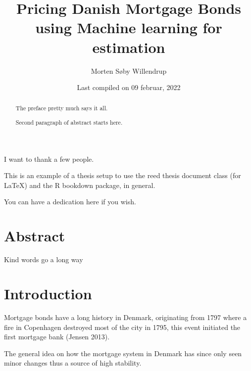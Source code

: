 \documentclass[12pt,twoside]{reedthesis}
\title{Pricing Danish Mortgage Bonds using Machine learning for estimation}
\author{Morten Søby Willendrup}
\date{Last compiled on 09 februar, 2022}
\begin{document}
  \maketitle

\frontmatter %
\pagestyle{empty} %
  \begin{acknowledgements}
    I want to thank a few people.
  \end{acknowledgements}
  \begin{preface}
    This is an example of a thesis setup to use the reed thesis document class
    (for LaTeX) and the R bookdown package, in general.
  \end{preface}
  \hypersetup{linkcolor=black}
  \setcounter{secnumdepth}{2}
  \setcounter{tocdepth}{2}
  \tableofcontents

  \listoftables

  \listoffigures
  \begin{abstract}
    The preface pretty much says it all.

    \par

    Second paragraph of abstract starts here.
  \end{abstract}
  \begin{dedication}
    You can have a dedication here if you wish.
  \end{dedication}
\mainmatter %
\pagestyle{fancyplain} %

\hypertarget{abstract}{%
\chapter*{Abstract}\label{abstract}}

Kind words go a long way

\hypertarget{intro}{%
\chapter{Introduction}\label{intro}}

Mortgage bonds have a long history in Denmark, originating from 1797 where a fire in Copenhagen destroyed most of the city in 1795, this event initiated the first mortgage bank (Jensen 2013).

The general idea on how the mortgage system in Denmark has since only seen minor changes thus a source of high stability.
\end{document}
